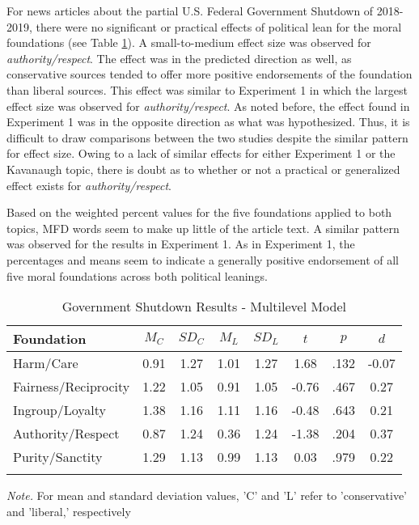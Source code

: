 \documentclass[
  english,
  man,floatsintext]{apa6}
\begin{document}
For news articles about the partial U.S. Federal Government Shutdown of 2018-2019, there were no significant or practical effects of political lean for the moral foundations (see Table \ref{tab:exp2-tablegs}). A small-to-medium effect size was observed for \emph{authority/respect}. The effect was in the predicted direction as well, as conservative sources tended to offer more positive endorsements of the foundation than liberal sources. This effect was similar to Experiment 1 in which the largest effect size was observed for \emph{authority/respect}. As noted before, the effect found in Experiment 1 was in the opposite direction as what was hypothesized. Thus, it is difficult to draw comparisons between the two studies despite the similar pattern for effect size. Owing to a lack of similar effects for either Experiment 1 or the Kavanaugh topic, there is doubt as to whether or not a practical or generalized effect exists for \emph{authority/respect}.

Based on the weighted percent values for the five foundations applied to both topics, MFD words seem to make up little of the article text. A similar pattern was observed for the results in Experiment 1. As in Experiment 1, the percentages and means seem to indicate a generally positive endorsement of all five moral foundations across both political leanings.

\begin{table}[h]

\begin{center}
\begin{threeparttable}

\caption{\label{tab:exp2-tablegs}Government Shutdown Results - Multilevel Model}

\footnotesize{

\begin{tabular}{lccccccc}
\toprule
Foundation & $M_C$ & $SD_C$ & $M_L$ & $SD_L$ & $t$ & $p$ & $d$\\
\midrule
Harm/Care & 0.91 & 1.27 & 1.01 & 1.27 & 1.68 & .132 & -0.07\\
Fairness/Reciprocity & 1.22 & 1.05 & 0.91 & 1.05 & -0.76 & .467 & 0.27\\
Ingroup/Loyalty & 1.38 & 1.16 & 1.11 & 1.16 & -0.48 & .643 & 0.21\\
Authority/Respect & 0.87 & 1.24 & 0.36 & 1.24 & -1.38 & .204 & 0.37\\
Purity/Sanctity & 1.29 & 1.13 & 0.99 & 1.13 & 0.03 & .979 & 0.22\\
\bottomrule
\addlinespace
\end{tabular}

}

\begin{tablenotes}[para]
\normalsize{\textit{Note.} For mean and standard deviation values, 'C' and 'L' refer to 'conservative' and 'liberal,' respectively}
\end{tablenotes}

\end{threeparttable}
\end{center}

\end{table}
\end{document}
